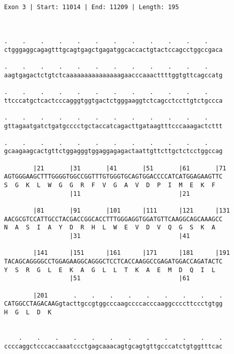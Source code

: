 \documentclass{article}
\begin{document}
\begin{Verbatim}
                                                       
 
Exon 3 | Start: 11014 | End: 11209 | Length: 195



.    .    .    .    .    .    .    .    .    .    .    .    
ctgggaggcagagtttgcagtgagctgagatggcaccactgtactccagcctggccgaca
                                                            
.    .    .    .    .    .    .    .    .    .    .    .    
aagtgagactctgtctcaaaaaaaaaaaaaaagaacccaaacttttggtgttcagccatg
                                                            
.    .    .    .    .    .    .    .    .    .    .    .    
ttcccatgctcactcccagggtggtgactctgggaaggtctcagcctccttgtctgccca
                                                            
.    .    .    .    .    .    .    .    .    .    .    .    
gttagaatgatctgatgcccctgctaccatcagacttgataagtttcccaaagactcttt
                                                            
.    .    .    .    .    .    .    .    .    .    .    .    
gcaagaagcactgttctggagggtggaggagagactaattgttcttgctctcctggccag
                                                            
        |21       |31       |41       |51       |61       |71
AGTGGGAAGCTTTGGGGTGGCCGGTTTGTGGGTGCAGTGGACCCCATCATGGAGAAGTTC
S  G  K  L  W  G  G  R  F  V  G  A  V  D  P  I  M  E  K  F  
                  |11                           |21         
  
        |81       |91       |101      |111      |121      |131
AACGCGTCCATTGCCTACGACCGGCACCTTTGGGAGGTGGATGTTCAAGGCAGCAAAGCC
N  A  S  I  A  Y  D  R  H  L  W  E  V  D  V  Q  G  S  K  A  
                  |31                           |41         
  
        |141      |151      |161      |171      |181      |191
TACAGCAGGGGCCTGGAGAAGGCAGGGCTCCTCACCAAGGCCGAGATGGACCAGATACTC
Y  S  R  G  L  E  K  A  G  L  L  T  K  A  E  M  D  Q  I  L  
                  |51                           |61         
  
        |201       .    .    .    .    .    .    .    .    .
CATGGCCTAGACAAGgtacttgccgtggcccaagccccacccaaggccccttccctgtgg
H  G  L  D  K                                               
                                                            
  
    .    .    .    .    .    .    .    .    .    .    .    .
ccccaggctcccaccaaatccctgagcaaacagtgcagtgttgcccatctgtggtttcac
                                                            

\end{Verbatim}
\end{document}
